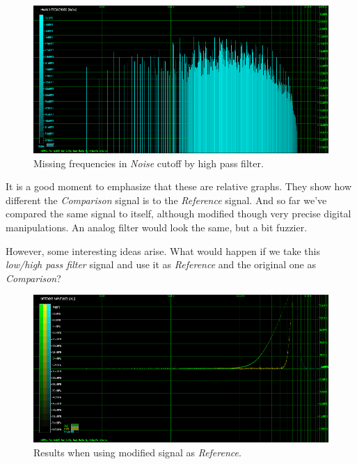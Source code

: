 \documentclass[10pt,a4paper]{report}
\begin{document}
\begin{figure}[H]
	\centering
	\includegraphics[width=1.0\linewidth]{images/interpretation/Plot4-6-Missing-Noise.png}
	\caption[Missing Noise]{Missing frequencies in \textit{Noise} cutoff by high pass filter.}
	\label{fig:plot4-6-missing-noise}
\end{figure}

It is a good moment to emphasize that these are relative graphs. They show how different the \textit{Comparison} signal is to the \textit{Reference} signal. And so far we've compared the same signal to itself, although modified though very precise digital manipulations. An analog filter would look the same, but a bit fuzzier. 

However, some interesting ideas arise. What would happen if we take this \textit{low/high pass filter} signal and use it as \textit{Reference} and the original one as \textit{Comparison}?

\begin{figure}[H]
	\centering
	\includegraphics[width=1.0\linewidth]{images/interpretation/Plot4-7-Reversed.png}
	\caption[Reversed]{Results when using modified signal as \textit{Reference}.}
	\label{fig:plot4-7-reversed}
\end{figure}
\end{document}
